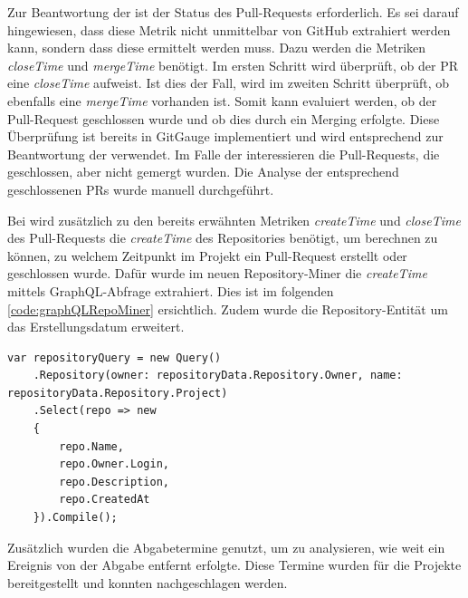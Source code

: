 Zur Beantwortung der  ist der Status des Pull-Requests erforderlich. Es sei darauf hingewiesen, dass diese Metrik nicht unmittelbar von GitHub extrahiert werden kann, sondern dass diese ermittelt werden muss. Dazu werden die Metriken \textit{closeTime} und \textit{mergeTime} benötigt. Im ersten Schritt wird überprüft, ob der PR  eine \textit{closeTime} aufweist. Ist dies der Fall, wird im zweiten Schritt überprüft, ob ebenfalls eine \textit{mergeTime} vorhanden ist. Somit kann evaluiert werden, ob der Pull-Request geschlossen wurde und ob dies durch ein Merging erfolgte. Diese Überprüfung ist bereits in GitGauge implementiert und wird entsprechend zur Beantwortung der  verwendet. Im Falle der  interessieren die Pull-Requests, die geschlossen, aber nicht gemergt wurden. Die Analyse der entsprechend geschlossenen PRs wurde manuell durchgeführt.

Bei  wird zusätzlich zu den bereits erwähnten Metriken \textit{createTime} und \textit{closeTime} des Pull-Requests die \textit{createTime} des Repositories benötigt, um berechnen zu können, zu welchem Zeitpunkt im Projekt ein Pull-Request erstellt oder geschlossen wurde.  Dafür wurde im neuen Repository-Miner die \textit{createTime } mittels GraphQL-Abfrage extrahiert. Dies ist im folgenden \autoref{code:graphQLRepoMiner} ersichtlich. Zudem wurde die Repository-Entität um das Erstellungsdatum erweitert. 
\begin{lstlisting}[language=CSharp, caption={GraphQL-Abfrage Repository}, label={code:graphQLRepoMiner}]
var repositoryQuery = new Query()
    .Repository(owner: repositoryData.Repository.Owner, name: repositoryData.Repository.Project)
    .Select(repo => new
    {
        repo.Name,
        repo.Owner.Login,
        repo.Description,
        repo.CreatedAt
    }).Compile();
\end{lstlisting}

Zusätzlich wurden die Abgabetermine genutzt, um zu analysieren, wie weit ein Ereignis von der Abgabe entfernt erfolgte. Diese Termine wurden für die Projekte bereitgestellt und konnten nachgeschlagen werden.

